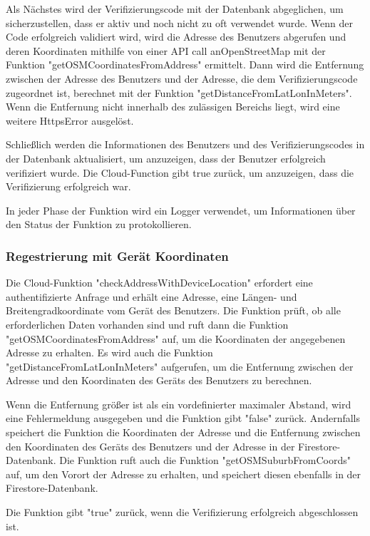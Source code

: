 Als Nächstes wird der Verifizierungscode mit der Datenbank
abgeglichen, um sicherzustellen, dass er aktiv und noch
nicht zu oft verwendet wurde. Wenn der Code erfolgreich
validiert wird, wird die Adresse des Benutzers abgerufen und
deren Koordinaten mithilfe von einer API call
anOpenStreetMap mit der Funktion "getOSMCoordinatesFromAddress"
ermittelt. Dann wird die Entfernung zwischen der Adresse des
Benutzers und der Adresse, die dem Verifizierungscode
zugeordnet ist, berechnet mit der Funktion "getDistanceFromLatLonInMeters". Wenn die Entfernung nicht
innerhalb des zulässigen Bereichs liegt, wird eine weitere
HttpsError ausgelöst.

Schließlich werden die Informationen des Benutzers und des
Verifizierungscodes in der Datenbank aktualisiert, um
anzuzeigen, dass der Benutzer erfolgreich verifiziert wurde.
Die Cloud-Function gibt true zurück, um anzuzeigen, dass die
Verifizierung erfolgreich war.

In jeder Phase der Funktion wird ein Logger verwendet, um Informationen über den Status der Funktion zu protokollieren.

\subsubsection{Regestrierung mit Gerät Koordinaten}

Die Cloud-Funktion "checkAddressWithDeviceLocation" erfordert eine authentifizierte Anfrage und
erhält eine Adresse, eine Längen- und Breitengradkoordinate
vom Gerät des Benutzers. Die Funktion prüft, ob alle
erforderlichen Daten vorhanden sind und ruft dann die
Funktion "getOSMCoordinatesFromAddress" auf, um die
Koordinaten der angegebenen Adresse zu erhalten. Es wird
auch die Funktion "getDistanceFromLatLonInMeters"
aufgerufen, um die Entfernung zwischen der Adresse und den
Koordinaten des Geräts des Benutzers zu berechnen.

Wenn die Entfernung größer ist als ein vordefinierter maximaler Abstand, wird eine Fehlermeldung ausgegeben und die Funktion gibt "false" zurück. Andernfalls speichert die Funktion die Koordinaten der Adresse und die Entfernung zwischen den Koordinaten des Geräts des Benutzers und der Adresse in der Firestore-Datenbank. Die Funktion ruft auch die Funktion "getOSMSuburbFromCoords" auf, um den Vorort der Adresse zu erhalten, und speichert diesen ebenfalls in der Firestore-Datenbank.

Die Funktion gibt "true" zurück, wenn die Verifizierung
erfolgreich abgeschlossen ist.

